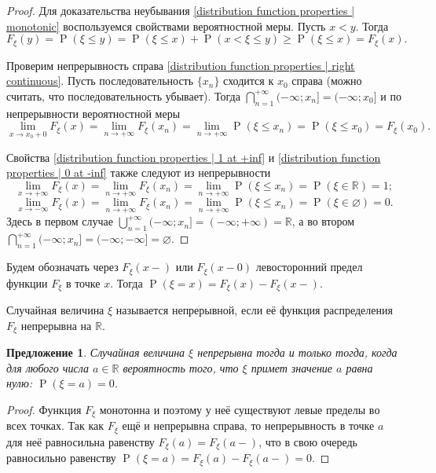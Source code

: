 \documentclass[12pt]{article}
\newtheorem{proposition}[theorem]{Предложение}
\numberwithin{theorem}{section}
\theoremstyle{definition}
\newcommand{\defin}[2]{\hypertarget{#2}{{\color{red} #1}}}
\newcommand{\RR}{\mathbb{R}}
\newcommand{\prob}{\operatorname{P}}
\begin{document}
	\begin{proof}
		Для доказательства неубывания \ref{distribution function properties | monotonic}
		воспользуемся свойствами вероятностной меры. Пусть $ x < y $.
		Тогда
		$$ F_\xi(y) = \prob(\xi \leqslant y) = \prob(\xi \leqslant x) + \prob(x < \xi \leqslant y) 
		\geqslant \prob(\xi \leqslant x) = F_\xi(x). $$
		
		Проверим непрерывность справа \ref{distribution function properties | right continuous}. 
		Пусть последовательность $ \{x_n\} $ сходится к $ x_0 $ справа (можно считать, что последовательность убывает).
		Тогда $ \bigcap\limits_{n = 1}^{+\infty} (-\infty; x_n] = (-\infty; x_0] $
		и по непрерывности вероятностной меры 
		$$ \lim\limits_{x \to x_0+0} F_{\xi}(x) = \lim\limits_{n \to +\infty} F_{\xi}(x_n) 
		= \lim\limits_{n \to +\infty} \prob(\xi \leqslant x_n) = \prob(\xi \leqslant x_0) = F_{\xi}(x_0). $$
		
		Свойства \ref{distribution function properties | 1 at +inf}
		и \ref{distribution function properties | 0 at -inf} также следуют из непрерывности
		$$ \lim\limits_{x \to +\infty} F_{\xi}(x) = \lim\limits_{n \to +\infty} F_{\xi}(x_n) 
		= \lim\limits_{n \to +\infty} \prob(\xi \leqslant x_n) = \prob(\xi \in \RR) = 1; $$
		$$ \lim\limits_{x \to -\infty} F_{\xi}(x) = \lim\limits_{n \to +\infty} F_{\xi}(x_n) 
		= \lim\limits_{n \to +\infty} \prob(\xi \leqslant x_n) = \prob(\xi \in \varnothing) = 0. $$
		Здесь в первом случае $ \bigcup\limits_{n = 1}^{+\infty} (-\infty; x_n] = (-\infty; +\infty) = \RR $,
		а во втором $ \bigcap\limits_{n = 1}^{+\infty} (-\infty; x_n] = (-\infty; -\infty] = \varnothing $.
	\end{proof}
	
	Будем обозначать через $ F_\xi(x-) $ или $ F_\xi(x-0) $ левосторонний предел функции $ F_\xi $ в точке $ x $.
	Тогда $ \prob(\xi = x) = F_\xi(x) - F_\xi(x-) $. 
	
	Случайная величина $ \xi $ называется \defin{непрерывной}{continuous-random-variable},
	если её функция распределения $ F_\xi $ непрерывна на $ \RR $.
	
	\begin{proposition}
		Случайная величина $ \xi $ непрерывна тогда и только тогда, когда для любого числа $ a \in \RR $
		вероятность того, что $ \xi $ примет значение $ a $ равна нулю: $ \prob(\xi = a) = 0 $.
	\end{proposition}
	
	\begin{proof}
		Функция $ F_\xi $ монотонна и поэтому у неё существуют левые пределы во всех точках.
		Так как $ F_\xi $ ещё и непрерывна справа, то непрерывность в точке $ a $
		для неё равносильна равенству $ F_\xi(a) = F_\xi(a-) $,
		что в свою очередь равносильно равенству $ \prob(\xi = a) = F_\xi(a) - F_\xi(a-) = 0 $.
	\end{proof}
	
\end{document}
